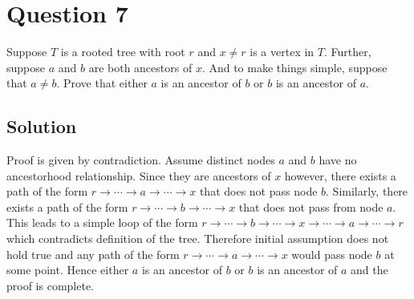
\section*{Question 7}
Suppose $T$ is a rooted tree with root $r$ and $x \neq r$ is a vertex in $T$.  Further, suppose $a$ and $b$ are both ancestors of $x$. And to make things simple, suppose that $a \neq b$. Prove that either $a$ is an ancestor of $b$ or $b$ is an ancestor of $a$.
\subsection*{Solution}
Proof is given by contradiction. Assume distinct nodes $a$ and $b$ have no ancestorhood relationship. Since they are ancestors of $x$ however, there exists a path of the form $r \rightarrow \cdots \rightarrow a \rightarrow \cdots \rightarrow x$ that does not pass node $b$. Similarly, there exists a path of the form $r \rightarrow \cdots \rightarrow b \rightarrow \cdots \rightarrow x$ that does not pass from node $a$. This leads to a simple loop of the form $r \rightarrow \cdots \rightarrow b \rightarrow \cdots \rightarrow x \rightarrow \cdots \rightarrow a \rightarrow \cdots \rightarrow r$ which contradicts definition of the tree. Therefore initial assumption does not hold true and any path of the form $r \rightarrow \cdots \rightarrow a \rightarrow \cdots \rightarrow x$ would pass node $b$ at some point. Hence either $a$ is an ancestor of $b$ or $b$ is an ancestor of $a$ and the proof is complete.
